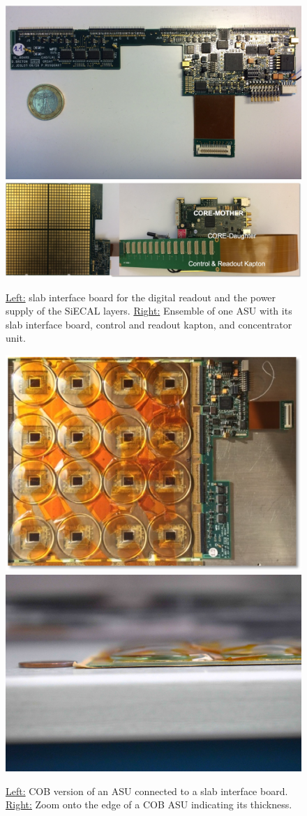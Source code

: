 \begin{figure}[t!]
\centering
\includegraphics[width=0.4\hsize]{Detector/fig/siwecal-slboard.jpg}
\includegraphics[width=0.56\hsize]{Detector/fig/siwecal-fevslcore.jpg}
\caption{\underline{Left:} slab interface board for the digital readout and the power supply of the SiECAL layers. \underline{Right:} Ensemble of one ASU with its slab interface board, control and readout kapton, and concentrator unit.}
\label{fig:det:SiWECAL_slcards}
\end{figure}


\begin{figure}[t!]
\centering
\includegraphics[width=0.35\hsize]{Detector/fig/siwecal-cob-sl.png}
\includegraphics[width=0.38\hsize]{Detector/fig/siwecal-cob-side-red.jpg}
\caption{\underline{Left:} COB version of an ASU connected to a slab interface board. \underline{Right:} Zoom onto the edge of a COB ASU indicating its thickness.}
\label{fig:det:SiWECAL_cob}
\end{figure}



